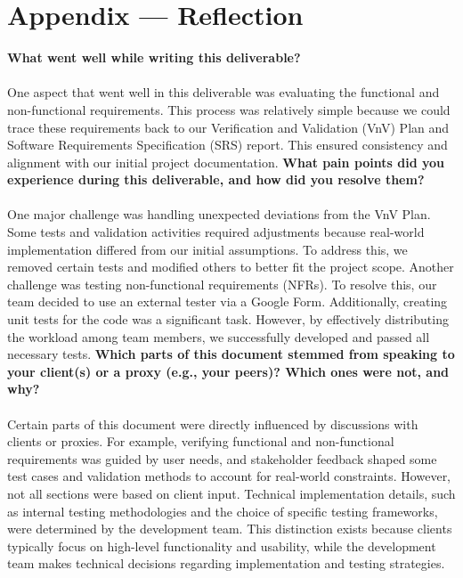 \documentclass[12pt, titlepage]{article}
\begin{document}
\section*{Appendix --- Reflection}
  \textbf{What went well while writing this deliverable?} \\\\
  One aspect that went well in this deliverable was evaluating the functional and non-functional requirements. This process was relatively simple because we could trace these requirements back to our Verification and Validation (VnV) Plan and Software Requirements Specification (SRS) report. This ensured consistency and alignment with our initial project documentation.
  \newline \newline \textbf{What pain points did you experience during this deliverable, and how did you resolve them?} \\\\
  One major challenge was handling unexpected deviations from the VnV Plan. Some tests and validation activities required adjustments because real-world implementation differed from our initial assumptions. To address this, we removed certain tests and modified others to better fit the project scope. Another challenge was testing non-functional requirements (NFRs). To resolve this, our team decided to use an external tester via a Google Form. Additionally, creating unit tests for the code was a significant task. However, by effectively distributing the workload among team members, we successfully developed and passed all necessary tests.
  \newline  \newline \textbf{Which parts of this document stemmed from speaking to your client(s) or a proxy (e.g., your peers)? Which ones were not, and why?}  \\\\
  Certain parts of this document were directly influenced by discussions with clients or proxies. For example, verifying functional and non-functional requirements was guided by user needs, and stakeholder feedback shaped some test cases and validation methods to account for real-world constraints.
  \newline
  However, not all sections were based on client input. Technical implementation details, such as internal testing methodologies and the choice of specific testing frameworks, were determined by the development team. This distinction exists because clients typically focus on high-level functionality and usability, while the development team makes technical decisions regarding implementation and testing strategies. \\ 
\end{document}
